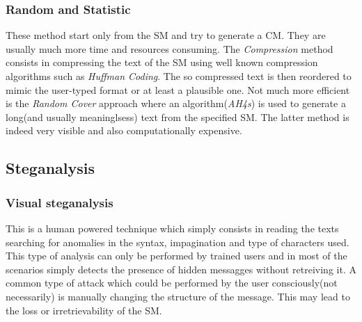 \documentclass[../../main.tex]{subfiles}
\begin{document}
\subsubsection{Random and Statistic}
These method start only from the SM and try to generate a CM.
They are usually much more time and resources consuming.
The \emph{Compression} method consists in compressing the text of the SM
using well known compression algorithms such as \emph{Huffman Coding}.
The so compressed text is then reordered to mimic the user-typed format or
at least a plausible one.
Not much more efficient is the \emph{Random Cover} approach where an
algorithm(\emph{AH4s}) is used to generate a long(and usually meaninglsess)
text from the specified SM.
The latter method is indeed very visible and also computationally expensive.

\subsection{Steganalysis}

\subsubsection{Visual steganalysis}
This is a human powered technique which simply consists in reading the texts
searching for anomalies in the syntax, impagination and type of characters
used.
This type of analysis can only be performed by trained users and in most of
the scenarios simply detects the presence of hidden messagges without
retreiving it.
A common type of attack which could be performed by the user consciously(not
necessarily) is manually changing the structure of the message.
This may lead to the loss or irretrievability of the SM.
\end{document}

